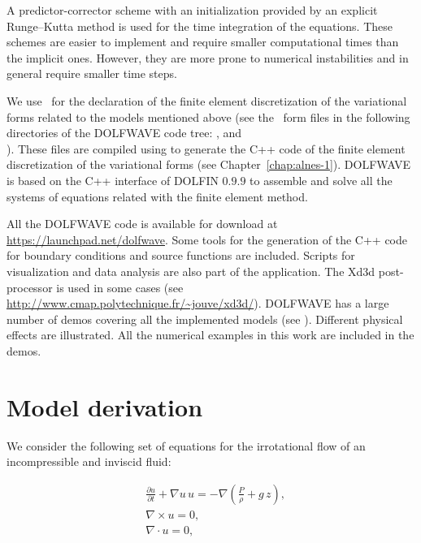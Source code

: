 A predictor-corrector scheme with an initialization provided by an
explicit Runge--Kutta method is used for the time integration of the
equations.  These schemes are easier to implement and require smaller
computational times than the implicit ones.  However, they are more
prone to numerical instabilities and in general require smaller time
steps.

We use \ufl\ for the declaration of the finite element discretization
of the variational forms related to the models mentioned above (see
the \ufl\ form files in the following directories of the DOLFWAVE code
tree: ,  and\\
).  These files are compiled using \ffc to
generate the C++ code of the finite element discretization of the
variational forms (see Chapter~\ref{chap:alnes-1}).  DOLFWAVE is based
on the C++ interface of DOLFIN $0.9.9$ to assemble and solve all the
systems of equations related with the finite element method.

All the DOLFWAVE code is available for download at
\url{https://launchpad.net/dolfwave}. Some tools for the generation of
the C++ code for boundary conditions and source functions are
included. Scripts for visualization and data analysis are also part of
the application. The Xd3d post-processor is used in some cases (see
\url{http://www.cmap.polytechnique.fr/~jouve/xd3d/}).  DOLFWAVE has a
large number of demos covering all the implemented models (see
). Different physical effects are illustrated.  All
the numerical examples in this work are included in the demos.

\section{Model derivation}
\label{sec:lopes:modelderivation}

We consider the following set of equations for the irrotational flow
of an incompressible and inviscid fluid:

\begin{subequations}\label{eq:lopes:euler}
\begin{align}
&\displaystyle\frac{\partial u}{\partial t}+\nabla u \,
  u=-\nabla\left(\frac{P}{\rho} +g\,
  z\right),\label{eq:lopes:euler-a} \\ &\nabla\times
  u={0},\label{eq:lopes:euler-b}
  \\ &\nabla\cdot{u}=0,\label{eq:lopes:euler-c}
\end{align}
\end{subequations}


